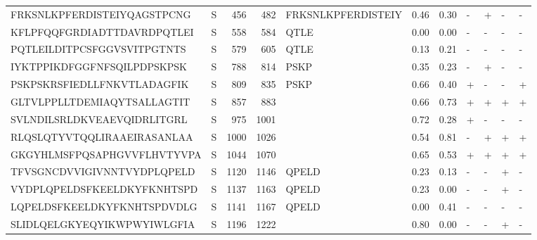 \begin{tabular}{llrrlrrllll}
FRKSNLKPFERDISTEIYQAGSTPCNG &       S &    456 &   482 &  FRKSNLKPFERDISTEIY &            0.46 &             0.30 &      - &       + &      - &       - \\
KFLPFQQFGRDIADTTDAVRDPQTLEI &       S &    558 &   584 &                QTLE &            0.00 &             0.00 &      - &       - &      - &       - \\
PQTLEILDITPCSFGGVSVITPGTNTS &       S &    579 &   605 &                QTLE &            0.13 &             0.21 &      - &       - &      - &       - \\
IYKTPPIKDFGGFNFSQILPDPSKPSK &       S &    788 &   814 &                PSKP &            0.35 &             0.23 &      - &       + &      - &       - \\
PSKPSKRSFIEDLLFNKVTLADAGFIK &       S &    809 &   835 &                PSKP &            0.66 &             0.40 &      + &       - &      - &       + \\
GLTVLPPLLTDEMIAQYTSALLAGTIT &       S &    857 &   883 &                     &            0.66 &             0.73 &      + &       + &      + &       + \\
SVLNDILSRLDKVEAEVQIDRLITGRL &       S &    975 &  1001 &                     &            0.72 &             0.28 &      + &       - &      - &       - \\
RLQSLQTYVTQQLIRAAEIRASANLAA &       S &   1000 &  1026 &                     &            0.54 &             0.81 &      - &       + &      + &       + \\
GKGYHLMSFPQSAPHGVVFLHVTYVPA &       S &   1044 &  1070 &                     &            0.65 &             0.53 &      + &       + &      + &       + \\
TFVSGNCDVVIGIVNNTVYDPLQPELD &       S &   1120 &  1146 &               QPELD &            0.23 &             0.13 &      - &       - &      + &       - \\
VYDPLQPELDSFKEELDKYFKNHTSPD &       S &   1137 &  1163 &               QPELD &            0.23 &             0.00 &      - &       - &      + &       - \\
LQPELDSFKEELDKYFKNHTSPDVDLG &       S &   1141 &  1167 &               QPELD &            0.00 &             0.41 &      - &       - &      - &       - \\
SLIDLQELGKYEQYIKWPWYIWLGFIA &       S &   1196 &  1222 &                     &            0.80 &             0.00 &      - &       - &      + &       - \\
\bottomrule
\end{tabular}
